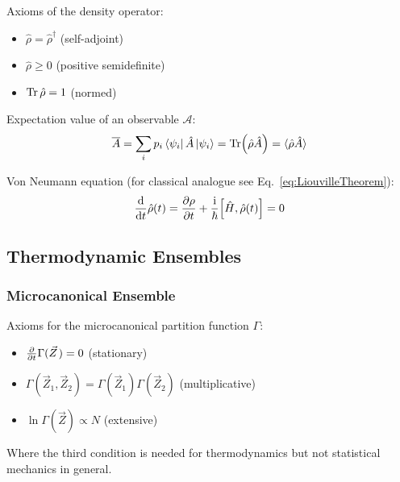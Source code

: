 			\noindent
			Axioms of the density operator:
			\begin{itemize}\itemsep -0pt	%
				\item $\hat{\rho} = \hat{\rho}^\dagger$ \hfill{(self-adjoint)}
				\item $\hat{\rho} \ge 0 $ \hfill{(positive semidefinite)}
				\item $\Tr \hat{\rho} = 1$ \hfill{(normed)}
			\end{itemize}

			\noindent
			Expectation value of an observable $\mathcal{A}$:
			\begin{equation}
				\overline{A} = \sum_i p_i \Bra{\psi_i}\hat{A}\Ket{\psi_i} = \Tr (\hat{\rho}\hat{A}) = \langle \hat{\rho}\hat{A} \rangle
			\end{equation}

			\noindent
			Von Neumann equation (for classical analogue see Eq.~\ref{eq:LiouvilleTheorem}):
			\begin{equation}
				\label{eq:VonNeumannEquation}
				\dv{t}\hat{\rho}(t) = \pdv{\rho}{t} + \frac{\i}{\hbar} \comm{\hat{H}}{\hat{\rho}(t)} = 0
			\end{equation}

	\subsection{Thermodynamic Ensembles}
		\subsubsection{Microcanonical Ensemble}
			\noindent
			Axioms for the microcanonical partition function $\Gamma$:
			\begin{itemize}\itemsep -0pt	%
				\item $\pdv{t}\Gamma(\vec{Z}) = 0$ \hfill{(stationary)}
				\item $\Gamma(\vec{Z}_1,\vec{Z}_2) = \Gamma(\vec{Z}_1)\Gamma(\vec{Z}_2) $ \hfill{(multiplicative)}
				\item $\ln\Gamma(\vec{Z}) \propto N$ \hfill{(extensive)}
			\end{itemize}
			Where the third condition is needed for thermodynamics but not statistical mechanics in general.

